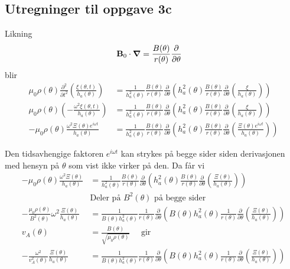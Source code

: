 \documentclass[reprint, english,notitlepage]{revtex4-1}  %
\begin{document}
\subsection{Utregninger til oppgave 3c}

Likning
\begin{align*}
  \textbf B_0 \cdot \boldsymbol \nabla &= \frac{B(\theta)}{r(\theta)} \frac{\partial}{\partial \theta}
\end{align*}
blir
\begin{align*}
  \mu_0 \rho(\theta) \frac{\partial^2}{\partial t^2} \left( \frac{\xi(\theta, t)}{h_a(\theta)} \right) &= \frac{1}{h_a^2(\theta)} \frac{B(\theta)}{r(\theta)} \frac{\partial}{\partial \theta} \left( h_a^2(\theta) \frac{B(\theta)}{r(\theta)} \frac{\partial}{\partial \theta} \left( \frac{\xi}{h_a(\theta)} \right) \right) \\
  \mu_0 \rho(\theta) \left( - \frac{\omega^2 \xi(\theta, t)}{h_a(\theta)} \right) &= \frac{1}{h_a^2(\theta)} \frac{B(\theta)}{r(\theta)} \frac{\partial}{\partial \theta} \left( h_a^2(\theta) \frac{B(\theta)}{r(\theta)} \frac{\partial}{\partial \theta} \left( \frac{\xi}{h_a(\theta)} \right) \right) \\
  - \mu_0 \rho(\theta) \frac{\omega^2 \Xi(\theta) e^{i \omega t}}{h_a(\theta)} &= \frac{1}{h_a^2(\theta)} \frac{B(\theta)}{r(\theta)} \frac{\partial}{\partial \theta} \left( h_a^2(\theta) \frac{B(\theta)}{r(\theta)} \frac{\partial}{\partial \theta} \left( \frac{\Xi(\theta) e^{i \omega t}}{h_a(\theta)} \right) \right)
\end{align*}

Den tidsavhengige faktoren $e^{i \omega t}$ kan strykes på begge sider siden derivasjonen med hensyn på $\theta$ som vist ikke virker på den. Da får vi
\begin{align*}
  - \mu_0 \rho(\theta) \frac{ \omega^2 \Xi(\theta) }{h_a(\theta)} &= \frac{1}{h_a^2(\theta)} \frac{B(\theta)}{r(\theta)} \frac{\partial}{\partial \theta} \left( h_a^2(\theta) \frac{B(\theta)}{r(\theta)} \frac{\partial}{\partial \theta} \left( \frac{ \Xi(\theta) }{h_a(\theta)} \right) \right) \\
  &\text{Deler på $B^2(\theta)$ på begge sider} \\
  - \frac{\mu_0 \rho(\theta)}{B^2(\theta)} \omega^2 \frac{\Xi(\theta)}{h_a(\theta)} &= \frac{1}{B(\theta) h_a^2(\theta)} \frac{1}{r(\theta)} \frac{\partial}{\partial \theta} \left( B(\theta) h_a^2(\theta) \frac{1}{r(\theta)} \frac{\partial}{\partial \theta} \left( \frac{ \Xi(\theta) }{h_a(\theta)} \right) \right) \\
  v_A(\theta) &= \frac{B(\theta)}{\sqrt{\mu_0 \rho(\theta)}} \quad \text{ gir} \\
  - \frac{\omega^2}{v_A^2(\theta)} \frac{\Xi(\theta)}{h_a(\theta)} &= \frac{1}{B(\theta) h_a^2(\theta)} \frac{1}{r(\theta)} \frac{\partial}{\partial \theta} \left( B(\theta) h_a^2(\theta) \frac{1}{r(\theta)} \frac{\partial}{\partial \theta} \left( \frac{ \Xi(\theta) }{h_a(\theta)} \right) \right)
\end{align*}
\end{document}
